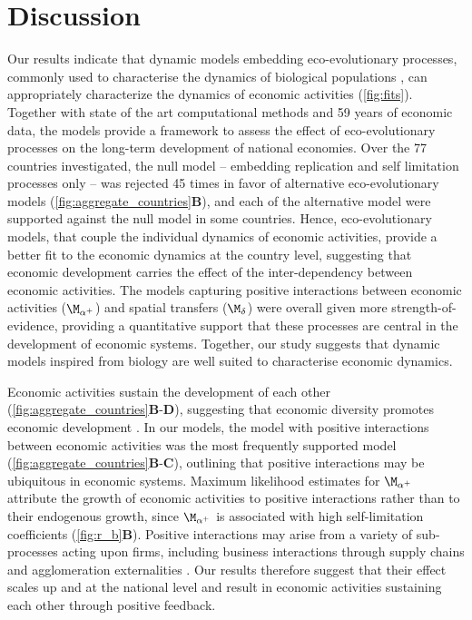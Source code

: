 \section{Discussion}

Our results indicate that dynamic models embedding eco-evolutionary processes, commonly used to characterise the dynamics of biological populations \citep{Bunin2017,Scheffer2006a,Case1990,Tilman1994b,eigen1988molecular}, can appropriately characterize the dynamics of economic activities (\cref{fig:fits}). Together with state of the art computational methods and 59 years of economic data, the models provide a framework to assess the effect of eco-evolutionary processes on the long-term development of national economies.
% 
Over the 77 countries investigated, the null model -- embedding replication and self limitation processes only -- was rejected 45 times in favor of alternative eco-evolutionary models (\cref{fig:aggregate_countries}\textbf{B}), and each of the alternative model were supported against the null model in some countries. Hence, eco-evolutionary models, that couple the individual dynamics of economic activities, provide a better fit to the economic dynamics at the country level, suggesting that economic development carries the effect of the inter-dependency between economic activities. The models capturing positive interactions between economic activities ($\modalphap$) and spatial transfers ($\moddelta$) were overall given more strength-of-evidence, providing a quantitative support that these processes are central in the development of economic systems.  Together, our study suggests that dynamic models inspired from biology are well suited to characterise economic dynamics. 

Economic activities sustain the development of each other (\cref{fig:aggregate_countries}\textbf{B}-\textbf{D}), suggesting that economic diversity promotes economic development \citep{Saviotti2020}. In our models, the model with positive interactions between economic activities was the most frequently supported model (\cref{fig:aggregate_countries}\textbf{B}-\textbf{C}), outlining that positive interactions may be ubiquitous in economic systems. Maximum likelihood estimates for $\modalphap$ attribute the growth of economic activities to positive interactions rather than to their endogenous growth, since $\modalphap$ is associated with high self-limitation coefficients (\cref{fig:r_b}\textbf{B}). 
% 
% 
Positive interactions may arise from a variety of sub-processes acting upon firms, including business interactions through supply chains \cite{Ozman2009,Saavedra2009a} and agglomeration externalities \cite{VanDerPanne2004}. Our results therefore suggest that their effect scales up and at the national level and result in economic activities sustaining each other through positive feedback. 

